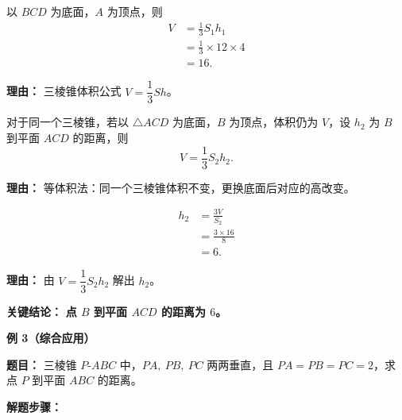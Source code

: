 \begin{description}[style=nextline, leftmargin=2.8em, labelsep=0.5em, itemsep=0.45em]
	\item[\textbf{第一步（求三棱锥体积）：}]
	      以 $BCD$ 为底面，$A$ 为顶点，则
	      \[
		      \begin{aligned}
			      V & = \frac13 S_1 h_1            \\
			        & = \frac13 \times 12 \times 4 \\
			        & = 16.
		      \end{aligned}
	      \]

	      \par\textbf{理由：}
	      三棱锥体积公式 $V=\dfrac13 S h$。

	\item[\textbf{第二步（换底建立等式）：}]
	      对于同一个三棱锥，若以 $\triangle ACD$ 为底面，$B$ 为顶点，体积仍为 $V$，设 $h_2$ 为 $B$ 到平面 $ACD$ 的距离，则
	      \[
		      V = \frac13 S_2 h_2.
	      \]

	      \par\textbf{理由：}
	      等体积法：同一个三棱锥体积不变，更换底面后对应的高改变。

	\item[\textbf{第三步（解出 $h_2$）：}]
	      \[
		      \begin{aligned}
			      h_2 & = \frac{3V}{S_2}        \\
			          & = \frac{3 \times 16}{8} \\
			          & = 6.
		      \end{aligned}
	      \]

	      \par\textbf{理由：}
	      由 $V=\dfrac13 S_2 h_2$ 解出 $h_2$。
\end{description}

\textbf{\textcolor{CExample}{关键结论：}} \textbf{点 $B$ 到平面 $ACD$ 的距离为 $6$。}

\medskip

\textbf{\textcolor{CExample}{例 3（综合应用）}}

\textbf{\textcolor{CExample}{题目：}} 三棱锥 $P\text{-}ABC$ 中，$PA,\ PB,\ PC$ 两两垂直，且 $PA=PB=PC=2$，求点 $P$ 到平面 $ABC$ 的距离。

\textbf{\textcolor{CExample}{解题步骤：}}


